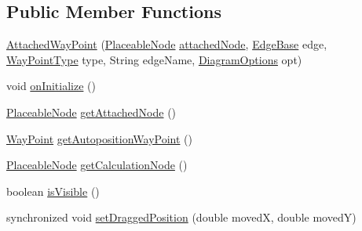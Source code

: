 \subsection*{Public Member Functions}
\begin{DoxyCompactItemize}
\item 
\hyperlink{classorg_1_1tzi_1_1use_1_1gui_1_1views_1_1diagrams_1_1waypoints_1_1_attached_way_point_a37e1501f9fb154f558922f48ca3f981e}{Attached\-Way\-Point} (\hyperlink{classorg_1_1tzi_1_1use_1_1gui_1_1views_1_1diagrams_1_1elements_1_1_placeable_node}{Placeable\-Node} \hyperlink{classorg_1_1tzi_1_1use_1_1gui_1_1views_1_1diagrams_1_1waypoints_1_1_attached_way_point_a4afc81c0c6490c31b7eb211e8521fb0a}{attached\-Node}, \hyperlink{classorg_1_1tzi_1_1use_1_1gui_1_1views_1_1diagrams_1_1elements_1_1edges_1_1_edge_base}{Edge\-Base} edge, \hyperlink{enumorg_1_1tzi_1_1use_1_1gui_1_1views_1_1diagrams_1_1waypoints_1_1_way_point_type}{Way\-Point\-Type} type, String edge\-Name, \hyperlink{classorg_1_1tzi_1_1use_1_1gui_1_1views_1_1diagrams_1_1_diagram_options}{Diagram\-Options} opt)
\item 
void \hyperlink{classorg_1_1tzi_1_1use_1_1gui_1_1views_1_1diagrams_1_1waypoints_1_1_attached_way_point_a55dda9832fb5c1a0920450bb93e0e5d4}{on\-Initialize} ()
\item 
\hyperlink{classorg_1_1tzi_1_1use_1_1gui_1_1views_1_1diagrams_1_1elements_1_1_placeable_node}{Placeable\-Node} \hyperlink{classorg_1_1tzi_1_1use_1_1gui_1_1views_1_1diagrams_1_1waypoints_1_1_attached_way_point_ad2cbbf73c124139148ed9dc36e87b36b}{get\-Attached\-Node} ()
\item 
\hyperlink{classorg_1_1tzi_1_1use_1_1gui_1_1views_1_1diagrams_1_1waypoints_1_1_way_point}{Way\-Point} \hyperlink{classorg_1_1tzi_1_1use_1_1gui_1_1views_1_1diagrams_1_1waypoints_1_1_attached_way_point_a684a6a2a0d05a9f8c2f91c8734e921b0}{get\-Autoposition\-Way\-Point} ()
\item 
\hyperlink{classorg_1_1tzi_1_1use_1_1gui_1_1views_1_1diagrams_1_1elements_1_1_placeable_node}{Placeable\-Node} \hyperlink{classorg_1_1tzi_1_1use_1_1gui_1_1views_1_1diagrams_1_1waypoints_1_1_attached_way_point_ae19cddd8080970c5e914627a4d369360}{get\-Calculation\-Node} ()
\item 
boolean \hyperlink{classorg_1_1tzi_1_1use_1_1gui_1_1views_1_1diagrams_1_1waypoints_1_1_attached_way_point_a260ecfc510fe47ce4231624c8885456e}{is\-Visible} ()
\item 
synchronized void \hyperlink{classorg_1_1tzi_1_1use_1_1gui_1_1views_1_1diagrams_1_1waypoints_1_1_attached_way_point_a3236915b7ab75a95d38591dc9828d895}{set\-Dragged\-Position} (double moved\-X, double moved\-Y)

\end{DoxyCompactItemize}
